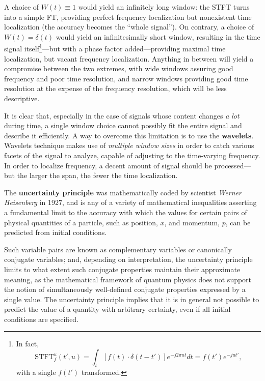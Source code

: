 \documentclass[\documentfontsize, twocolumn]{\classname}
\begin{document}
A choice of $W(t)\equiv 1$ would yield an infinitely long window: the STFT turns into a simple FT, providing perfect frequency localization but nonexistent time localization (the accuracy becomes the ``whole signal''). On contrary, a choice of $W(t) = \delta(t)$ would yield an infinitesimally short window, resulting in the time signal itself\footnote{In fact, 
\[
    \mathrm{STFT}^u_f(t', u) = \int_t \left[f(t) \cdot \delta(t - t')\right]e^{-j2\pi ut}dt = f(t')e^{-jut'},
\] with a single $f(t')$ transformed.}---but with a phase factor added---providing maximal time localization, but vacant frequency localization. Anything in between will yield a compromise between the two extremes, with wide windows assuring good frequency and poor time resolution, and narrow windows providing good time resolution at the expense of the frequency resolution, which will be less descriptive.

It is clear that, especially in the case of signals whose content changes \emph{a lot} during time, a single window choice cannot possibly fit the entire signal and describe it efficiently. A way to overcome this limitation is to use the \textbf{wavelets}. Wavelets technique makes use of \emph{multiple window sizes} in order to catch various facets of the signal to analyze, capable of adjusting to the time-varying frequency. In order to localize frequency, a decent amount of signal should be processed---but the larger the span, the fewer the time localization.

The \textbf{uncertainty principle} was mathematically coded by scientist \emph{Werner Heisenberg} in 1927, and is any of a variety of mathematical inequalities asserting a fundamental limit to the accuracy with which the values for certain pairs of physical quantities of a particle, such as position, $x$, and momentum, $p$, can be predicted from initial conditions\cite{bib:wernerHeisemberg}.

Such variable pairs are known as complementary variables or canonically conjugate variables; and, depending on interpretation, the uncertainty principle limits to what extent such conjugate properties maintain their approximate meaning, as the mathematical framework of quantum physics does not support the notion of simultaneously well-defined conjugate properties expressed by a single value. The uncertainty principle implies that it is in general not possible to predict the value of a quantity with arbitrary certainty, even if all initial conditions are specified\cite{bib:wernerHeisemberg}.
\end{document}
